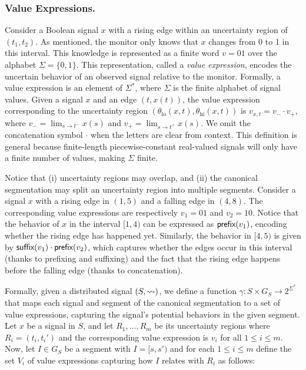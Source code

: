 \subsubsection{Value Expressions.}
Consider a Boolean signal \( x \) with a rising edge within an uncertainty region of \((t_1, t_2)\).
As mentioned, the monitor only knows that \( x \) changes from 0 to 1 in this interval.
This knowledge is represented as a finite word \( v = 01 \) over the alphabet \(\Sigma = \{0,1\}\).
This representation, called a \emph{value expression}, encodes the uncertain behavior of an observed signal relative to the monitor.
Formally, a value expression is an element of \(\Sigma^*\), where \(\Sigma\) is the finite alphabet of signal values.
Given a signal \( x \) and an edge \((t, x(t))\), the value expression corresponding to the uncertainty region \((\theta_{\text{lo}}(x,t), \theta_{\text{hi}}(x,t))\) is \( v_{x,t} = v_- \cdot v_+ \), where \( v_- = \lim_{s \to t^-} x(s) \) and \( v_+ = \lim_{s \to t^+} x(s) \).
We omit the concatenation symbol \(\cdot\) when the letters are clear from context.
This definition is general because finite-length piecewise-constant real-valued signals will only have a finite number of values, making \(\Sigma\) finite.

Notice that (i) uncertainty regions may overlap, and (ii) the canonical segmentation may split an uncertainty region into multiple segments.
Consider a signal $x$ with a rising edge in $(1,5)$ and a falling edge in $(4,8)$.
The corresponding value expressions are respectively $v_1 = 01$ and $v_2 = 10$.
Notice that the behavior of $x$ in the interval $[1,4)$ can be expressed as $\textsf{prefix}(v_1)$, encoding whether the rising edge has happened yet.
Similarly, the behavior in $[4,5)$ is given by $\textsf{suffix}(v_1) \cdot \textsf{prefix}(v_2)$, which captures whether the edges occur in this interval (thanks to prefixing and suffixing) and the fact that the rising edge happens before the falling edge (thanks to concatenation).

%	
%

Formally, given a distributed signal $(S,{\rightsquigarrow})$, we define a function $\gamma : S \times G_S \to 2^{\Sigma^*}$ that maps each signal and segment of the canonical segmentation to a set of value expressions, capturing the signal's potential behaviors in the given segment.
Let $x$ be a signal in $S$, and let $R_1, \ldots, R_m$ be its uncertainty regions where $R_i = (t_i, t_i')$ and the corresponding value expression is $v_i$ for all $1 \leq i \leq m$.
Now, let $I \in G_S$ be a segment with $I = [s, s')$ and for each $1 \leq i \leq m$ define the set $V_i$ of value expressions capturing how $I$ relates with $R_i$ as follows:

